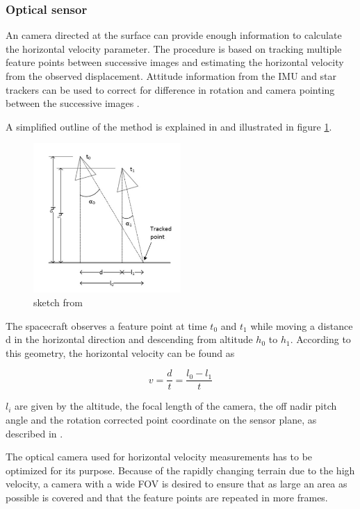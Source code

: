   
\subsubsection{Optical sensor}
An camera directed at the surface can provide enough information to calculate the horizontal velocity parameter. The procedure is based on tracking multiple feature points between successive images and estimating the horizontal velocity from the observed displacement. Attitude information from the IMU and star trackers can be used to correct for difference in rotation and camera pointing between the successive images \cite{alessandro}.

A simplified outline of the method is explained in \cite{alessandro} and illustrated in figure \ref{horvel}.

\begin{figure}
\begin{center}
\includegraphics[width=0.5\textwidth]{figures/navtheory/horvel}
\caption{sketch from \cite{alessandro}}
\label{horvel}
\end{center}
\end{figure}


The spacecraft observes a feature point at time $t_0$ and $t_1$ while moving a distance d in the horizontal direction and descending from altitude $h_0$ to $h_1$. According to this geometry, the horizontal velocity can be found as

\begin{equation}
v=\dfrac{d}{t}=\dfrac{l_0-l_1}{t}
\end{equation}

$l_i$ are given by the altitude, the focal length of the camera, the off nadir pitch angle and the rotation corrected point coordinate on the sensor plane, as described in \cite{alessandro}.


The optical camera used for horizontal velocity measurements has to be optimized for its purpose. Because of the rapidly changing terrain due to the high velocity, a camera with a wide FOV is desired to ensure that as large an area as possible is covered and that the feature points are repeated in more frames.


